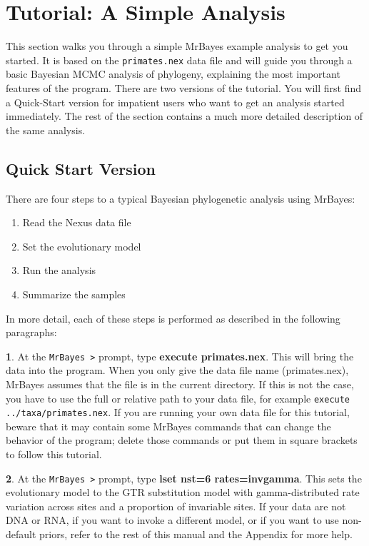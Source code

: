 \documentclass[12pt]{book}
\begin{document}
\chapter{Tutorial: A Simple Analysis}
\label{tutorialSimple}
This section walks you through a simple MrBayes example analysis to get you started. It is based on the
\texttt{primates.nex} data file and will guide you through a basic Bayesian MCMC analysis of
phylogeny, explaining the most important features of the program. There are two versions
of the tutorial. You will first find a Quick-Start version for impatient users who want to get an analysis
started immediately. The rest of the section contains a much more detailed description of the same analysis.

\section{Quick Start Version}
There are four steps to a typical Bayesian phylogenetic analysis using MrBayes:
\begin{enumerate}
\item Read the Nexus data file
\item Set the evolutionary model
\item Run the analysis
\item Summarize the samples
\end{enumerate}
In more detail, each of these steps is performed as described in the following paragraphs:

\textbf{1}. At the \texttt{MrBayes >} prompt, type \textbf{execute primates.nex}. This will bring the data
 into the program. When you only give the data file name (primates.nex), MrBayes assumes that the file is in
 the current directory. If this is not the case, you have to use the full or relative path to your data file,
 for example \texttt{execute ../taxa/primates.nex}. If you are running your own data file for this tutorial,
 beware that it may contain some MrBayes commands that can change the behavior of the program; delete those
 commands or put them in square brackets to follow this tutorial. 

\textbf{2}. At the \texttt{MrBayes >} prompt, type \textbf{lset nst=6 rates=invgamma}. This sets the 
evolutionary model to the GTR substitution model with gamma-distributed rate variation across sites and a
 proportion of invariable sites. If your data are not DNA or RNA, if you want to invoke a different model,
 or if you want to use non-default priors, refer to the rest of this manual and the Appendix for more help.
\end{document}

